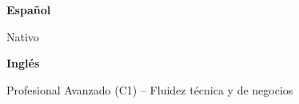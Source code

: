 %
%
%
%
%


\noindent
\begin{minipage}[t]{\linewidth}
    \parbox[t]{0.30\linewidth}{%
        {\cvBodyStyle\textcolor{cvPrimary}{\textbf{Español}}}%
    }%
    \hfill
    \parbox[t]{0.68\linewidth}{%
        {\cvBodyStyle\textcolor{cvSecondary}{Nativo}}%
    }\par
    \vspace{1.5mm}
    \parbox[t]{0.30\linewidth}{%
        {\cvBodyStyle\textcolor{cvPrimary}{\textbf{Inglés}}}%
    }%
    \hfill
    \parbox[t]{0.68\linewidth}{%
        {\cvBodyStyle\textcolor{cvSecondary}{Profesional Avanzado (C1) -- Fluidez técnica y de negocios}}%
    }\par
\end{minipage}

